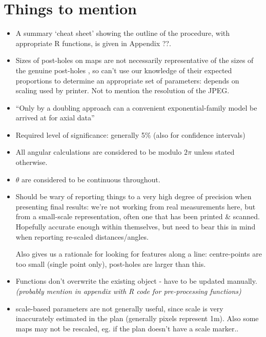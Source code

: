 \documentclass[10pt,fleqn]{article}
\begin{document}
\section*{Things to mention}
\begin{itemize}

\item
A summary `cheat sheet' showing the outline of the procedure, with appropriate R functions, is given in Appendix ??.

\item
Sizes of post-holes on maps are not necessarily representative of the sizes of the genuine post-holes , so can't use our knowledge of their expected proportions to determine an appropriate set of parameters: depends on scaling used by printer. Not to mention the resolution of the JPEG.

\item 
``Only by a doubling approach can a convenient exponential-family model be arrived at for axial data'' \cite{Arnold2011}

\item
Required level of significance: generally 5\% (also for confidence intervals)

\item
All angular calculations are considered to be modulo $2\pi$ unless stated otherwise.

\item
$\theta$ are considered to be continuous throughout.

\item
Should be wary of reporting things to a very high degree of precision when presenting final results: we're not working from real measurements here, but from a small-scale representation, often one that has been printed \& scanned. Hopefully accurate enough within themselves, but need to bear this in mind when reporting re-scaled distances/angles.

Also gives us a rationale for looking for features along a line: centre-points are too small (single point only), post-holes are larger than this.

\item
Functions don't overwrite the existing object - have to be updated manually.
\textit{(probably mention in appendix with R code for pre-processing functions)
}

\item
scale-based parameters are not generally useful, since scale is very inaccurately estimated in the plan (generally  pixels represent 1m). Also some maps may not be rescaled, eg. if the plan doesn't have a scale marker..

\end{itemize}
\newpage
\end{document}
